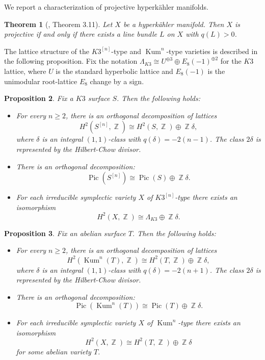 \documentclass{article}
\DeclareMathOperator{\bZ}{\mathbb{Z}}
\DeclareMathOperator{\Pic}{Pic}
\DeclareMathOperator{\Kum}{Kum}
\newcommand{\hilb}[2][n]{#2^{[#1]}}
\newtheorem{proposition}{Proposition}[section]
\newtheorem{theorem}[proposition]{Theorem}
\begin{document}
We report a characterization of projective hyperk\"ahler manifolds.
\begin{theorem}[\cite{huybrechts1997compacthyperkaehlermanifoldsbasic}, Theorem 3.11]\label{theo_projective_hyperkahler_manifolds}
    Let $X$ be a hyperk\"ahler manifold. Then $X$ is projective if and only if there exists a line bundle $L$ on $X$ with $q(L)>0$.
\end{theorem}

The lattice structure of the $\hilb[n]{K3}$-type and $\Kum^n$-type varieties is described in the following proposition. Fix the notation $\Lambda_{K3}\cong U^{\oplus 3}\oplus E_8(-1)^{\oplus 2}$ for the $K3$ lattice, where $U$ is the standard hyperbolic lattice and $E_8(-1)$ is the unimodular root-lattice $E_8$ change by a sign.

\begin{proposition}\label{p_k3_type_lattice}
    Fix a $K3$ surface $S$. Then the following holds:
    \begin{itemize}
        \item[(i)] For every $n\geq 2$, there is an orthogonal decomposition of lattices $$H^2(\hilb[n]{S},\bZ)\cong H^2(S,\bZ)\oplus \bZ\delta,$$
        where $\delta$ is an integral $(1,1)$-class with $q(\delta)=-2(n-1)$. The class $2\delta$ is represented by the Hilbert-Chow divisor.
        \item[(ii)] There is an orthogonal decomposition:
        $$\Pic(\hilb[n]{S})\cong\Pic(S)\oplus\bZ\delta.$$
        \item[(iii)]For each irreducible symplectic variety $X$ of $\hilb[n]{K3}$-type there exists an isomorphism $$H^2(X,\bZ)\cong\Lambda_{K3}\oplus \bZ\delta.$$  
    \end{itemize}
\end{proposition}

\begin{proposition}\label{p_kum_type_lattice}
    Fix an abelian surface $T$. Then the following holds:
    \begin{itemize}
        \item[(i)] For every $n\geq 2$, there is an orthogonal decomposition of lattices $$H^2(\Kum^n(T),\bZ)\cong H^2(T,\bZ)\oplus \bZ\delta,$$
        where $\delta$ is an integral $(1,1)$-class with $q(\delta)=-2(n+1)$. The class $2\delta$ is represented by the Hilbert-Chow divisor.
        \item[(ii)] There is an orthogonal decomposition:
        $$\Pic(\Kum^n(T))\cong\Pic(T)\oplus\bZ\delta.$$
        \item[(iii)]For each irreducible symplectic variety $X$ of $\Kum^n$-type there exists an isomorphism $$H^2(X,\bZ)\cong H^2(T,\bZ)\oplus \bZ\delta$$
        for some abelian variety $T$.
    \end{itemize}
\end{proposition}
\end{document}
